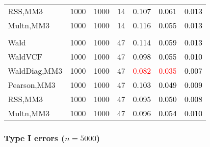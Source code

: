 \documentclass[
]{article}
\begin{document}
\begin{table}[H]
{\begin{tabular}[t]{lrrrrrr}
\hspace{1em}RSS,MM3 & 1000 & 1000 & 14 & \textcolor{black}{0.107} & \textcolor{black}{0.061} & \textcolor{black}{0.013}\\
\hspace{1em}Multn,MM3 & 1000 & 1000 & 14 & \textcolor{black}{0.116} & \textcolor{black}{0.055} & \textcolor{black}{0.013}\\
\addlinespace[0.3em]
\multicolumn{7}{l}{\textbf{3F 15V}}\\
\hspace{1em}Wald & 1000 & 1000 & 47 & \textcolor{black}{0.114} & \textcolor{black}{0.059} & \textcolor{black}{0.013}\\
\hspace{1em}WaldVCF & 1000 & 1000 & 47 & \textcolor{black}{0.098} & \textcolor{black}{0.055} & \textcolor{black}{0.010}\\
\hspace{1em}WaldDiag,MM3 & 1000 & 1000 & 47 & \textcolor{red}{0.082} & \textcolor{red}{0.035} & \textcolor{black}{0.007}\\
\hspace{1em}Pearson,MM3 & 1000 & 1000 & 47 & \textcolor{black}{0.103} & \textcolor{black}{0.049} & \textcolor{black}{0.009}\\
\hspace{1em}RSS,MM3 & 1000 & 1000 & 47 & \textcolor{black}{0.095} & \textcolor{black}{0.050} & \textcolor{black}{0.008}\\
\hspace{1em}Multn,MM3 & 1000 & 1000 & 47 & \textcolor{black}{0.096} & \textcolor{black}{0.054} & \textcolor{black}{0.010}\\
\bottomrule
\end{tabular}}
\endgroup{}
\end{table}

\subsubsection{\texorpdfstring{Type I errors
(\(n=5000\))}{Type I errors (n=5000)}}\label{type-i-errors-n5000-3}
\end{document}
